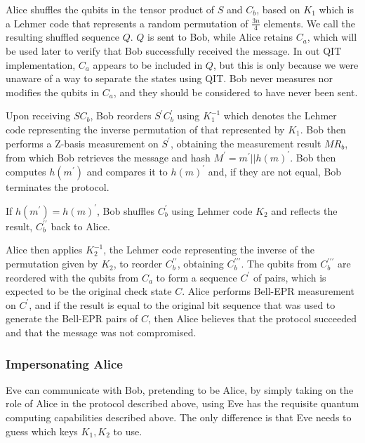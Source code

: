 \documentclass[conference]{IEEEtran}
\begin{document}
Alice shuffles the qubits in the tensor product of $S$ and $C_{b}$,
based on $K_{1}$ which is a {\LARGE\color{red}Lehmer code} that represents a random permutation of $\frac{3n}{4}$ elements.%
We call the resulting shuffled sequence $Q$. $Q$ is sent to Bob, while Alice retains $C_{a}$,
which will be used later to verify that Bob successfully received the message. In out QIT implementation,
$C_{a}$ appears to be included in $Q$, but this is only because we were unaware of a way to separate the states
using QIT. Bob never measures nor modifies the qubits in $C_{a}$, and they should be considered to have never been sent.

Upon receiving $SC_{b}$, Bob reorders $S^{\prime}C_{b}^{\prime}$
using $K_{1}^{-1}$ which denotes the Lehmer code representing the inverse permutation of that represented by $K_{1}$.
Bob then performs a Z-basis measurement on $S^{\prime}$,
obtaining the measurement result $MR_{b}$, from which Bob retrieves
the message and hash $M^{\prime}=m^{\prime}||h\left(m\right)^{\prime}$.
Bob then computes $h\left(m^{\prime}\right)$ and compares it to $h\left(m\right)^{\prime}$
and, if they are not equal, Bob terminates the protocol.

If $h\left(m^{\prime}\right)=h\left(m\right)^{\prime}$, Bob shuffles
$C_{b}^{\prime}$ using Lehmer code $K_{2}$ and reflects the result, $C_{b}^{\prime\prime}$
back to Alice.

Alice then applies $K_{2}^{-1}$, the Lehmer code representing the inverse
of the permutation given by $K_{2}$, to reorder $C_{b}^{\prime\prime}$, obtaining
$C_{b}^{\prime\prime\prime}$. The qubits from $C_{b}^{\prime\prime\prime}$ are reordered
with the qubits from $C_{a}$ to form a sequence $C^{\prime}$ of pairs, which is expected to be the
original check state $C$. Alice performs Bell-EPR measurement on $C^{\prime}$, and if the result
is equal to the original bit sequence that was used to generate the Bell-EPR pairs of $C$,
then Alice believes that the protocol succeeded and that the message was not compromised.

\subsubsection{Impersonating Alice}

Eve can communicate with Bob, pretending to be Alice, by simply taking
on the role of Alice in the protocol described above, using Eve has
the requisite quantum computing capabilities described above. The
only difference is that Eve needs to guess which keys $K_{1},K_{2}$
to use.
\end{document}

